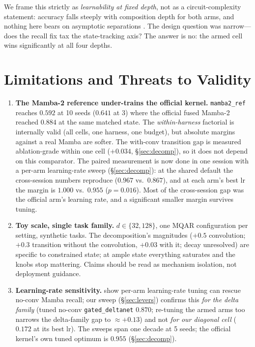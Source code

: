 \documentclass{article}
\newcommand{\gdn}{\texttt{gated\_deltanet}}
\newcommand{\mambaref}{\texttt{mamba2\_ref}}
\begin{document}
We frame this strictly as \emph{learnability at fixed depth}, not as a circuit-complexity statement: accuracy falls steeply with composition depth for both arms, and nothing here bears on asymptotic separations \citep{merrill2024illusion,grazzi2025negative}. The design question was narrow---does the recall fix tax the state-tracking axis? The answer is no: the armed cell wins significantly at all four depths.

\section{Limitations and Threats to Validity}\label{sec:threats}

\begin{enumerate}[leftmargin=1.4em,itemsep=2pt]
\item \textbf{The Mamba-2 reference under-trains the official kernel.} \mambaref{} reaches $0.592$ at 10 seeds ($0.641$ at 3) where the official fused Mamba-2 reached $0.884$ at the same matched state. The \emph{within-harness} factorial is internally valid (all cells, one harness, one budget), but absolute margins against a real Mamba are softer. The with-conv transition gap is measured ablation-grade within one cell ($+0.034$, \S\ref{sec:decomp}), so it does not depend on this comparator. The paired measurement is now done in one session with a per-arm learning-rate sweep (\S\ref{sec:decomp}): at the shared default the cross-session numbers reproduce ($0.967$ vs.\ $0.867$), and at each arm's best lr the margin is $1.000$ vs.\ $0.955$ ($p{=}0.016$). Most of the cross-session gap was the official arm's learning rate, and a significant smaller margin survives tuning.
\item \textbf{Toy scale, single task family.} $d\in\{32,128\}$, one MQAR configuration per setting, synthetic tasks. The decomposition's magnitudes ($+0.5$ convolution; $+0.3$ transition without the convolution, $+0.03$ with it; decay unresolved) are specific to constrained state; at ample state everything saturates and the knobs stop mattering. Claims should be read as mechanism isolation, not deployment guidance.
\item \textbf{Learning-rate sensitivity.} \citet{okpekpe2025recall} show per-arm learning-rate tuning can rescue no-conv Mamba recall; our sweep (\S\ref{sec:levers}) confirms this \emph{for the delta family} (tuned no-conv \gdn{} $0.870$; re-tuning the armed arms too narrows the delta-family gap to ${\approx}{+}0.13$) and not \emph{for our diagonal cell} ($0.172$ at its best lr). The sweeps span one decade at 5 seeds; the official kernel's own tuned optimum is $0.955$ (\S\ref{sec:decomp}).

\end{enumerate}
\end{document}
